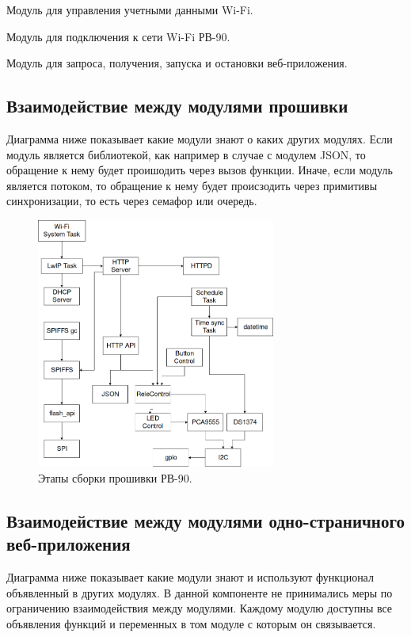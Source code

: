 \begin{my_itemize}
\item Модуль для управления учетными данными Wi-Fi.
\item Модуль для подключения к сети Wi-Fi РВ-90.
\item Модуль для запроса, получения, запуска и остановки веб-приложения.
\end{my_itemize}







\newpage
\subsection{Взаимодействие между модулями прошивки}
Диаграмма ниже показывает какие модули знают о каких других модулях. Если модуль является библиотекой, как например в случае с модулем JSON, то обращение к нему будет проишодить через вызов функции. Иначе, если модуль является потоком, то обращение к нему будет происзодить через примитивы синхронизации, то есть через семафор или очередь.

\begin{figure}[h!]
    \centering
    \includegraphics[width=0.7\textwidth]{firmware_module_hierarchy.png}
    \caption{Этапы сборки прошивки РВ-90.}
\end{figure}


\newpage
\subsection{Взаимодействие между модулями одно-страничного веб-приложения}
Диаграмма ниже показывает какие модули знают и используют функционал объявленный в других модулях. В данной компоненте не принимались меры по ограничению взаимодействия между модулями. Каждому модулю доступны все объявления функций и переменных в том модуле с которым он связывается.

